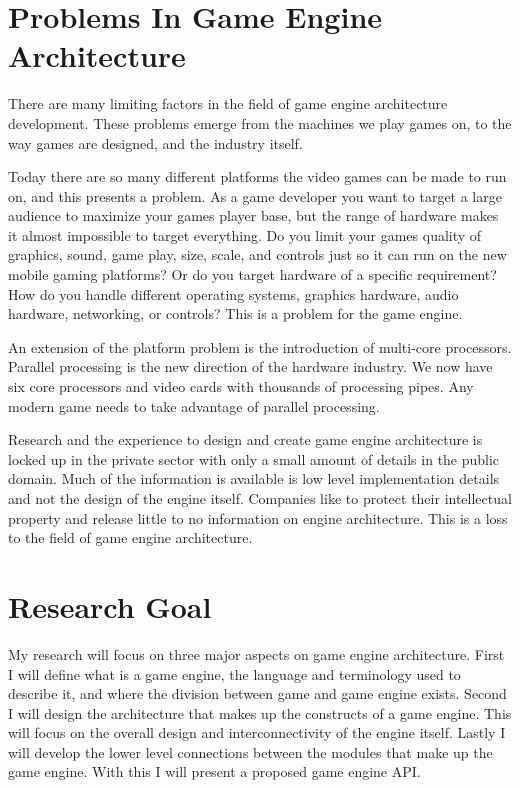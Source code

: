 \documentclass[12pt,a4paper,oneside]{article}
\begin{document}
\section{ Problems In Game Engine Architecture }
There are many limiting factors in the field of game engine architecture development.  These problems emerge from the machines we play games on, to the way games are designed, and the industry itself.

Today there are so many different platforms the video games can be made to run on, and this presents a problem.  As a game developer you want to target a large audience to maximize your games player base, but the range of hardware makes it almost impossible to target everything.  Do you limit your games quality of graphics, sound, game play, size, scale, and controls just so it can run on the new mobile gaming platforms?  Or do you target hardware of a specific requirement?  How do you handle different operating systems, graphics hardware, audio hardware, networking, or controls?  This is a problem for the game engine.

An extension of the platform problem is the introduction of multi-core processors.  Parallel processing is the new direction of the hardware industry.  We now have six core processors and video cards with thousands of processing pipes.  Any modern game needs to take advantage of parallel processing.  

Research and the experience to design and create game engine architecture is locked up in the private sector with only a small amount of details in the public domain.  Much of the information is available is low level implementation details  and not the design of the engine itself.  Companies like to protect their intellectual property and release little to no information on engine architecture.  This is a loss to the field of game engine architecture.

\section{ Research Goal }
My research will focus on three major aspects on game engine architecture.  First I will define what is a game engine, the language and terminology used to describe it, and where the division between game and game engine exists.  Second I will design the architecture that makes up the constructs of a game engine.  This will focus on the overall design and interconnectivity of the engine itself.  Lastly I will develop the lower level connections between the modules that make up the game engine.  With this I will present a proposed game engine API.
\end{document}
